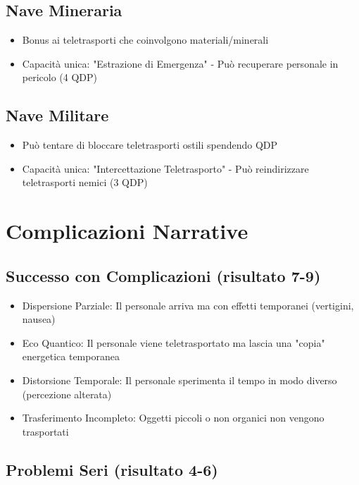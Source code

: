 \documentclass[letterpaper,twocolumn,openany,nodeprecatedcode]{dndbook}
\begin{document}
\subsection{Nave Mineraria}

\begin{itemize}
    \item Bonus ai teletrasporti che coinvolgono materiali/minerali
    \item Capacità unica: "Estrazione di Emergenza" - Può recuperare personale in pericolo (4 QDP)
\end{itemize}

\subsection{Nave Militare}

\begin{itemize}
    \item Può tentare di bloccare teletrasporti ostili spendendo QDP
    \item Capacità unica: "Intercettazione Teletrasporto" - Può reindirizzare teletrasporti nemici (3 QDP)
\end{itemize}

\section{Complicazioni Narrative}
\subsection{Successo con Complicazioni (risultato 7-9)}

\begin{itemize}
    \item Dispersione Parziale: Il personale arriva ma con effetti temporanei (vertigini, nausea)
    \item Eco Quantico: Il personale viene teletrasportato ma lascia una "copia" energetica temporanea
    \item Distorsione Temporale: Il personale sperimenta il tempo in modo diverso (percezione alterata)
    \item Trasferimento Incompleto: Oggetti piccoli o non organici non vengono trasportati
\end{itemize}

\subsection{Problemi Seri (risultato 4-6)}
\end{document}
